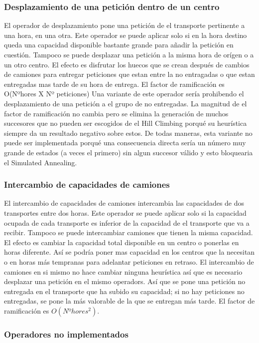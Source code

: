 \documentclass{article}
\begin{document}
\subsubsection{Desplazamiento de una petición dentro de un centro}
El operador de desplazamiento pone una petición de el transporte pertinente a una hora, en una otra. Este operador se puede aplicar solo si en la hora destino queda una capacidad disponible bastante grande para añadir la petición en cuestión. Tampoco se puede desplazar una petición a la misma hora de orígen o a un otro centro.
El efecto es disfrutar los huecos que se crean después de cambios de camiones para entregar peticiones que estan entre la no entragadas o que estan entregadas mas tarde de su hora de entrega.
El factor de ramificación es O(Nºhores X Nº peticiones) 
Una variante de este operador sería prohibendo el desplazamiento de una petición a el grupo de no entregadas. La magnitud de el factor de ramificación no cambia pero se elimina la generación de muchos succesores que no pueden ser escogidos de el Hill Climbing porqué su heurística siempre da un resultado negativo sobre estos. De todas maneras, esta variante no puede ser implementada porqué una consecuencia directa sería un número muy grande de estados (a veces el primero) sin algun succesor válido y esto bloquearia el Simulated Annealing. 
\subsubsection{Intercambio de capacidades de camiones}
El intercambio de capacidades de camiones intercambia las capacidades de dos transportes entre dos horas. Este operador se puede aplicar solo si la capacidad ocupada de cada transporte es inferior de la capacidad de el transporte que va a recibir. Tampoco se puede intercambiar camiones que tienen la misma capacidad. El efecto es cambiar la capacidad total disponible en un centro o ponerlas en horas diferente. Así se podría poner mas capacidad en los centros que la necesitan o en horas más tempranas para adelantar peticiones en retraso. 
El intercambio de camiones en si mismo no hace cambiar ninguna heurística así que es necesario desplazar una petición en el mismo operadors. Así que se pone una petición no entregada en el transporte que ha subido su capacidad; si no hay peticiones no entregadas, se pone la más valorable de la que se entregan más tarde.
El factor de ramificación es $O(Nºhores^2)$.
\subsubsection{Operadores no implementados}
\end{document}
